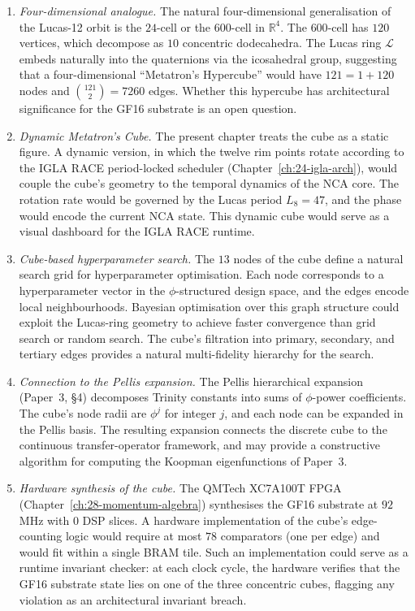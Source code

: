 \begin{enumerate}
\item \emph{Four-dimensional analogue.} The natural four-dimensional
  generalisation of the Lucas-12 orbit is the $24$-cell or the
  $600$-cell in $\mathbb{R}^{4}$. The $600$-cell has $120$ vertices,
  which decompose as $10$ concentric dodecahedra. The Lucas ring
  $\mathcal{L}$ embeds naturally into the quaternions via the
  icosahedral group, suggesting that a four-dimensional
  ``Metatron's Hypercube'' would have $121 = 1 + 120$ nodes and
  $\binom{121}{2} = 7260$ edges. Whether this hypercube has
  architectural significance for the GF16 substrate is an open
  question.

\item \emph{Dynamic Metatron's Cube.} The present chapter treats the
  cube as a static figure. A dynamic version, in which the twelve rim
  points rotate according to the IGLA RACE period-locked scheduler
  (Chapter~\ref{ch:24-igla-arch}), would couple the cube's geometry
  to the temporal dynamics of the NCA core. The rotation rate would be
  governed by the Lucas period $L_8 = 47$, and the phase would encode
  the current NCA state. This dynamic cube would serve as a visual
  dashboard for the IGLA RACE runtime.

\item \emph{Cube-based hyperparameter search.} The $13$ nodes of the
  cube define a natural search grid for hyperparameter optimisation.
  Each node corresponds to a hyperparameter vector in the
  $\phi$-structured design space, and the edges encode local
  neighbourhoods. Bayesian optimisation over this graph structure
  could exploit the Lucas-ring geometry to achieve faster convergence
  than grid search or random search. The cube's filtration into
  primary, secondary, and tertiary edges provides a natural
  multi-fidelity hierarchy for the search.

\item \emph{Connection to the Pellis expansion.} The Pellis
  hierarchical expansion (Paper~3, \S4) decomposes Trinity constants
  into sums of $\phi$-power coefficients. The cube's node radii are
  $\phi^{j}$ for integer $j$, and each node can be expanded in the
  Pellis basis. The resulting expansion connects the discrete cube to
  the continuous transfer-operator framework, and may provide a
  constructive algorithm for computing the Koopman eigenfunctions of
  Paper~3.

\item \emph{Hardware synthesis of the cube.} The QMTech XC7A100T
  FPGA (Chapter~\ref{ch:28-momentum-algebra}) synthesises the GF16
  substrate at $92$\,MHz with $0$ DSP slices. A hardware
  implementation of the cube's edge-counting logic would require at
  most $78$ comparators (one per edge) and would fit within a single
  BRAM tile. Such an implementation could serve as a runtime
  invariant checker: at each clock cycle, the hardware verifies that
  the GF16 substrate state lies on one of the three concentric cubes,
  flagging any violation as an architectural invariant breach.
\end{enumerate}

